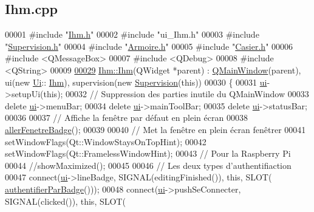\hypertarget{_ihm_8cpp_source}{}\subsection{Ihm.\+cpp}
\label{_ihm_8cpp_source}

\begin{DoxyCode}
00001 \textcolor{preprocessor}{#include "\hyperlink{_ihm_8h}{Ihm.h}"}
00002 \textcolor{preprocessor}{#include "ui\_Ihm.h"}
00003 \textcolor{preprocessor}{#include "\hyperlink{_supervision_8h}{Supervision.h}"}
00004 \textcolor{preprocessor}{#include "\hyperlink{_armoire_8h}{Armoire.h}"}
00005 \textcolor{preprocessor}{#include "\hyperlink{_casier_8h}{Casier.h}"}
00006 \textcolor{preprocessor}{#include <QMessageBox>}
00007 \textcolor{preprocessor}{#include <QDebug>}
00008 \textcolor{preprocessor}{#include <QString>}
00009 
\hyperlink{class_ihm_a50a7a15775452923868348bdbe4fa51e}{00029} \hyperlink{class_ihm_a50a7a15775452923868348bdbe4fa51e}{Ihm::Ihm}(QWidget *parent) : \hyperlink{class_q_main_window}{QMainWindow}(parent), ui(new \hyperlink{namespace_ui}{Ui}::
      \hyperlink{class_ihm}{Ihm}), supervision(new \hyperlink{class_supervision}{Supervision}(this))
00030 \{
00031     \hyperlink{class_ihm_a0ac5f47856566ceeeca1720109bf70ea}{ui}->setupUi(\textcolor{keyword}{this});
00032     \textcolor{comment}{// Suppression des parties inutile du QMainWindow}
00033     \textcolor{keyword}{delete} \hyperlink{class_ihm_a0ac5f47856566ceeeca1720109bf70ea}{ui}->menuBar;
00034     \textcolor{keyword}{delete} \hyperlink{class_ihm_a0ac5f47856566ceeeca1720109bf70ea}{ui}->mainToolBar;
00035     \textcolor{keyword}{delete} \hyperlink{class_ihm_a0ac5f47856566ceeeca1720109bf70ea}{ui}->statusBar;
00036 
00037     \textcolor{comment}{// Affiche la fenêtre par défaut en plein écran}
00038     \hyperlink{class_ihm_a08d82e976e48a2f8fced132a4ba22049}{allerFenetreBadge}();
00039 
00040     \textcolor{comment}{// Met la fenêtre en plein écran fenêtrer}
00041     setWindowFlags(Qt::WindowStaysOnTopHint);
00042     setWindowFlags(Qt::FramelessWindowHint);
00043     \textcolor{comment}{// Pour la Raspberry Pi}
00044     \textcolor{comment}{//showMaximized();}
00045 
00046     \textcolor{comment}{// Les deux types d'authentifiaction}
00047     connect(\hyperlink{class_ihm_a0ac5f47856566ceeeca1720109bf70ea}{ui}->lineBadge, SIGNAL(editingFinished()), \textcolor{keyword}{this}, SLOT(
      \hyperlink{class_ihm_abf037b73a8416097f768dd6eb7e20e0e}{authentifierParBadge}()));
00048     connect(\hyperlink{class_ihm_a0ac5f47856566ceeeca1720109bf70ea}{ui}->pushSeConnecter, SIGNAL(clicked()), \textcolor{keyword}{this}, SLOT(

\end{DoxyCode}
